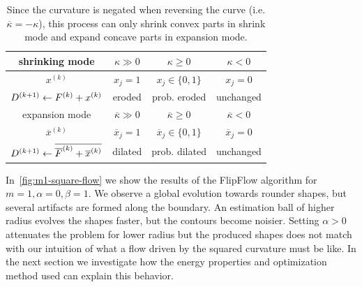 \begin{table}
  \center
  \setlength{\extrarowheight}{0.75em}
  \begin{tabular}{|c|c|c|c|} \hline
    shrinking mode &    $\kappa \gg 0$ & $\kappa \geq 0$ &  $\kappa < 0$ \\ \hline
    $x^{(k)}$ & $x_j=1$ & $x_j \in \{0,1\}$ & $x_j=0$ \\ \hline
    $D^{(k+1)} \leftarrow F^{(k)} + x^{(k)}$ & eroded & prob. eroded & unchanged  \\ \hline \hline
    expansion mode &    $\overline{\kappa} \gg 0$ & $\overline{\kappa} \geq 0$ & $\overline{\kappa} < 0$ \\ \hline
    $\overline{x}^{(k)}$ & $\overline{x}_j=1$ & $\overline{x}_j \in \{0,1\}$ & $\overline{x}_j=0$ \\ \hline
    $D^{(k+1)} \leftarrow \overline{\overline{F}^{(k)} + \overline{x}^{(k)}}$ & dilated & prob. dilated & unchanged \\ \hline 
  \end{tabular}
  
  \caption{  Since the curvature is negated when reversing the curve (i.e. $\overline{\kappa}=-\kappa$), this process can only shrink  convex parts in shrink mode and expand concave parts in expansion mode.}
   \label{tab:flow-summary}	  

\end{table}


In~\cref{fig:m1-square-flow} we show the results of the FlipFlow algorithm for $m=1,\alpha=0, \beta=1$. We observe a global evolution towards rounder shapes, but several artifacts are formed along the boundary. An estimation ball of higher radius evolves the shapes faster, but the contours become noisier. Setting $\alpha >0$ attenuates the problem for lower radius but the produced shapes does not match with our intuition of what a flow driven by the squared curvature must be like. In the next section we investigate how the energy properties and optimization method used can explain this behavior.

